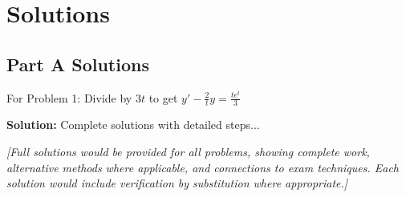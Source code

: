 \documentclass[12pt]{article}
\newcommand{\solution}[1]{\textbf{Solution:} #1}
\begin{document}
\section*{Solutions}

\subsection*{Part A Solutions}
\begin{hint}
For Problem 1: Divide by $3t$ to get $y' - \frac{2}{t}y = \frac{t e^t}{3}$
\end{hint}

\solution{Complete solutions with detailed steps...}

\textit{[Full solutions would be provided for all problems, showing complete work, alternative methods where applicable, and connections to exam techniques. Each solution would include verification by substitution where appropriate.]}
\end{document}
